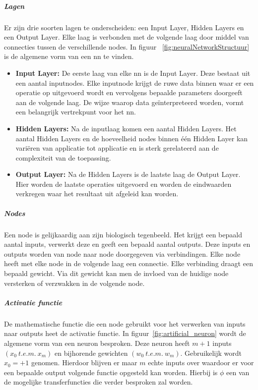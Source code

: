 			\subparagraph{Lagen}
			Er zijn drie soorten lagen te onderscheiden: een Input Layer, Hidden Layers en een Output Layer. Elke laag is verbonden met de volgende laag door middel van connecties tussen de verschillende nodes. In figuur ~\ref{fig:neuralNetworkStructuur} is de algemene vorm van een \gls{nn} te vinden.
		
				\begin{itemize}
					\item \textbf{Input Layer:} De eerste laag van elke \gls{nn} is de Input Layer. Deze bestaat uit een aantal inputnodes. Elke inputnode krijgt de ruwe data binnen waar er een operatie op uitgevoerd wordt en vervolgens bepaalde parameters doorgeeft aan de volgende laag. De wijze waarop data ge\"interpreteerd worden, vormt een belangrijk vertrekpunt voor het \gls{nn}.
					\item \textbf{Hidden Layers:}  Na de inputlaag komen een aantal Hidden Layers. Het aantal Hidden Layers en de hoeveelheid nodes binnen \'e\'en Hidden Layer kan vari\"eren van applicatie tot applicatie en is sterk gerelateerd aan de complexiteit van de toepassing.
					\item \textbf{Output Layer:} Na de Hidden Layers is de laatste laag de Output Layer. Hier worden de laatste operaties uitgevoerd en worden de eindwaarden verkregen waar het resultaat uit afgeleid kan worden.
				\end{itemize}
			
			\subparagraph{Nodes}
			Een node is gelijkaardig aan zijn biologisch tegenbeeld. Het krijgt een bepaald aantal inputs, verwerkt deze en geeft een bepaald aantal outputs. Deze inputs en outputs worden van node naar node doorgegeven via verbindingen. Elke node heeft met elke node in de volgende laag een connectie. Elke verbinding draagt een bepaald gewicht. Via dit gewicht kan men de invloed van de huidige node versterken of verzwakken in de volgende node.
	
			\subparagraph{Activatie functie}
			De mathematische functie die een node gebruikt voor het verwerken van inputs naar outputs heet de activatie functie. In figuur~\ref{fig:artificial_neuron} wordt de algemene vorm van een neuron besproken. Deze neuron heeft $m+1$ inputs $\left(  x_0 ~t.e.m.~  x_m\right) $ en bijhorende gewichten $\left(  w_0~  t.e.m. ~ w_m \right) $.
			Gebruikelijk wordt $x_0 = +1$ genomen. Hierdoor blijven er maar $m$ echte inputs over waardoor er voor een bepaalde output volgende functie opgesteld kan worden. Hierbij is $\phi$ een van de mogelijke transferfuncties die verder besproken zal worden.

